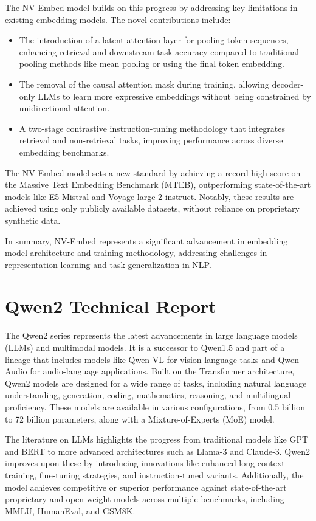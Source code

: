 The NV-Embed model builds on this progress by addressing key limitations in existing embedding models. The novel contributions include:
\begin{itemize}
    \item The introduction of a latent attention layer for pooling token sequences, enhancing retrieval and downstream task accuracy compared to traditional pooling methods like mean pooling or using the final token embedding.
    \item The removal of the causal attention mask during training, allowing decoder-only LLMs to learn more expressive embeddings without being constrained by unidirectional attention.
    \item A two-stage contrastive instruction-tuning methodology that integrates retrieval and non-retrieval tasks, improving performance across diverse embedding benchmarks.
\end{itemize}

The NV-Embed model sets a new standard by achieving a record-high score on the Massive Text Embedding Benchmark (MTEB), outperforming state-of-the-art models like E5-Mistral and Voyage-large-2-instruct. Notably, these results are achieved using only publicly available datasets, without reliance on proprietary synthetic data.

In summary, NV-Embed represents a significant advancement in embedding model architecture and training methodology, addressing challenges in representation learning and task generalization in NLP.

\section*{Qwen2 Technical Report}
The Qwen2 series represents the latest advancements in large language models (LLMs) and multimodal models. It is a successor to Qwen1.5 and part of a lineage that includes models like Qwen-VL for vision-language tasks and Qwen-Audio for audio-language applications. Built on the Transformer architecture, Qwen2 models are designed for a wide range of tasks, including natural language understanding, generation, coding, mathematics, reasoning, and multilingual proficiency. These models are available in various configurations, from 0.5 billion to 72 billion parameters, along with a Mixture-of-Experts (MoE) model.

The literature on LLMs highlights the progress from traditional models like GPT and BERT to more advanced architectures such as Llama-3 and Claude-3. Qwen2 improves upon these by introducing innovations like enhanced long-context training, fine-tuning strategies, and instruction-tuned variants. Additionally, the model achieves competitive or superior performance against state-of-the-art proprietary and open-weight models across multiple benchmarks, including MMLU, HumanEval, and GSM8K.

